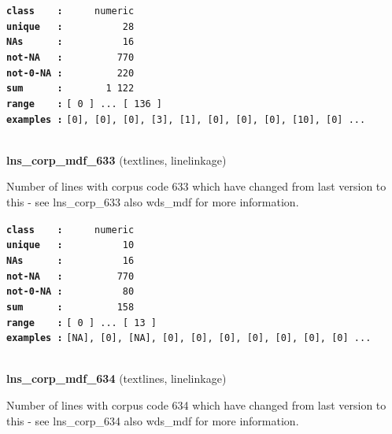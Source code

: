 \documentclass[]{article}
\begin{document}
\textbf{\texttt{class\ \ \ \ :}} \texttt{~~~~~numeric}\\
\textbf{\texttt{unique\ \ \ :}} \texttt{~~~~~~~~~~28}\\
\textbf{\texttt{NAs\ \ \ \ \ \ :}} \texttt{~~~~~~~~~~16}\\
\textbf{\texttt{not-NA\ \ \ :}} \texttt{~~~~~~~~~770}\\
\textbf{\texttt{not-0-NA\ :}} \texttt{~~~~~~~~~220}\\
\textbf{\texttt{sum\ \ \ \ \ \ :}} \texttt{~~~~~~~1~122}\\
\textbf{\texttt{range\ \ \ \ :}}
\texttt{{[}\ 0\ {]}\ ...\ {[}\ 136\ {]}}\\
\textbf{\texttt{examples\ :}}
\texttt{{[}0{]},\ {[}0{]},\ {[}0{]},\ {[}3{]},\ {[}1{]},\ {[}0{]},\ {[}0{]},\ {[}0{]},\ {[}10{]},\ {[}0{]}\ ...}\\

~

\textbf{lns\_corp\_mdf\_633} (textlines, linelinkage)

Number of lines with corpus code 633 which have changed from last
version to this - see lns\_corp\_633 also wds\_mdf for more information.

\textbf{\texttt{class\ \ \ \ :}} \texttt{~~~~~numeric}\\
\textbf{\texttt{unique\ \ \ :}} \texttt{~~~~~~~~~~10}\\
\textbf{\texttt{NAs\ \ \ \ \ \ :}} \texttt{~~~~~~~~~~16}\\
\textbf{\texttt{not-NA\ \ \ :}} \texttt{~~~~~~~~~770}\\
\textbf{\texttt{not-0-NA\ :}} \texttt{~~~~~~~~~~80}\\
\textbf{\texttt{sum\ \ \ \ \ \ :}} \texttt{~~~~~~~~~158}\\
\textbf{\texttt{range\ \ \ \ :}}
\texttt{{[}\ 0\ {]}\ ...\ {[}\ 13\ {]}}\\
\textbf{\texttt{examples\ :}}
\texttt{{[}NA{]},\ {[}0{]},\ {[}NA{]},\ {[}0{]},\ {[}0{]},\ {[}0{]},\ {[}0{]},\ {[}0{]},\ {[}0{]},\ {[}0{]}\ ...}\\

~

\textbf{lns\_corp\_mdf\_634} (textlines, linelinkage)

Number of lines with corpus code 634 which have changed from last
version to this - see lns\_corp\_634 also wds\_mdf for more information.
\end{document}
